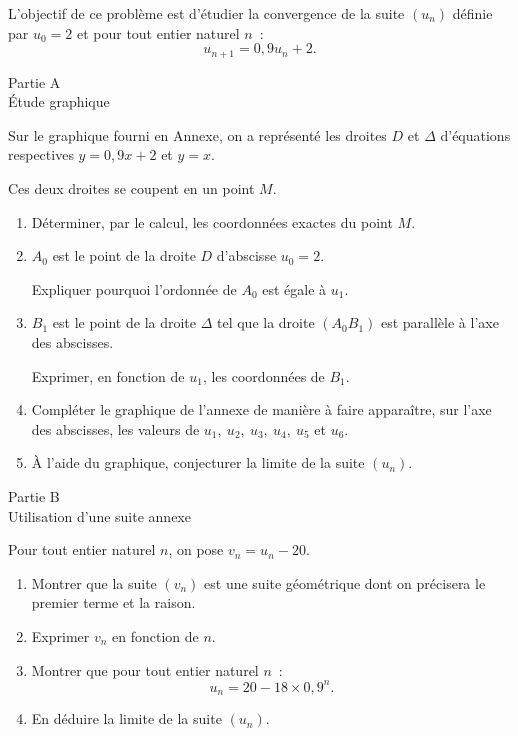 
%
L'objectif de ce problème est d'étudier la convergence de la suite $(u_n)$ définie par $u_0=2$ et pour tout entier naturel $n$~:
\[ u_{n+1} = 0,9u_n+2.\]
%
\begin{center}\begin{h3}Partie A\\ \'Etude graphique \end{h3}\end{center}
Sur le graphique fourni en Annexe, on a représenté les droites $D$ et $\Delta$ d'équations respectives $y=0,9x+2$ et $y=x$.
\par
Ces deux droites se coupent en un point $M$.
\begin{enumerate}
     \item
     Déterminer, par le calcul, les coordonnées exactes du point $M$.
     \item
     $A_0$ est le point de la droite $D$ d'abscisse $u_0=2$.
     \par
     Expliquer pourquoi l'ordonnée de $A_0$ est égale à $u_1$.
     \item
     $B_1$ est le point de la droite $\Delta$ tel que la droite $(A_0B_1)$ est parallèle à l'axe des abscisses.
     \par
     Exprimer, en fonction de $u_1$, les coordonnées de $B_1$.
     \item
     Compléter le graphique de l'annexe de manière à faire apparaître, sur l'axe des abscisses, les valeurs de $u_1,\ u_2,\ u_3,\ u_4,\ u_5$ et $u_6$.
     \item
     \`A l'aide du graphique, conjecturer la limite de la suite $(u_n)$.
\end{enumerate}
%
\begin{center}\begin{h3}Partie B\\ Utilisation d'une suite annexe \end{h3}\end{center}
Pour tout entier naturel $n$, on pose $v_n=u_n-20$.
\begin{enumerate}
     \item
     Montrer que la suite $(v_n)$ est une suite géométrique dont on précisera le premier terme et la raison.
     \item
     Exprimer $v_n$ en fonction de $n$.
     \item
     Montrer que pour tout entier naturel $n$~:
     \[ u_n=20-18 \times 0,9^n. \]
     \item
     En déduire la limite de la suite $(u_n)$.
\end{enumerate}
\newpage
%
%
%
%

